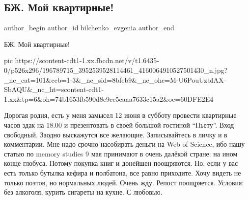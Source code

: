  
 
 
 
 
 
\subsection{БЖ. Мой квартирные!}
\label{sec:04_06_2021.fb.bilchenko_evgenia.1.kvartira_priglashenie}
\ifcmt
 author_begin
   author_id bilchenko_evgenia
 author_end
\fi

БЖ. Мой квартирные!

\ifcmt
  pic https://scontent-cdt1-1.xx.fbcdn.net/v/t1.6435-0/p526x296/196789715_3952539528114461_4160064910527501430_n.jpg?_nc_cat=101&ccb=1-3&_nc_sid=8bfeb9&_nc_ohc=M-U6PouUzbIAX-SbAQU&_nc_ht=scontent-cdt1-1.xx&tp=6&oh=74b1653fb590d8e9cc5caaa7633c15a2&oe=60DFE2E4
\fi

Дорогая родня, есть у меня замысел 12 июня в субботу провести квартирные часов
эдак на 18.00 и презентовать в своей большой гостиной \enquote{Пьету}. Вход
свободный. Заодно выскажутся все желающие. Записывайтесь в личку и в
комментарии. Мне надо срочно насобирать деньги на Web of Science, ибо нашу
статью по memory studies 9 мая принимают в очень далёкой стране: на ином конце
глобуса. Потому покупка книг и донейшен поощряются. Но, если у вас есть только
бутылка кефира и полбатона, все равно приходите. Хочу видеть не только поэтов,
но нормальных людей. Очень жду. Репост поощряется. Условия: без алкоголя,
курить сигареты на кухне. С любовью.
